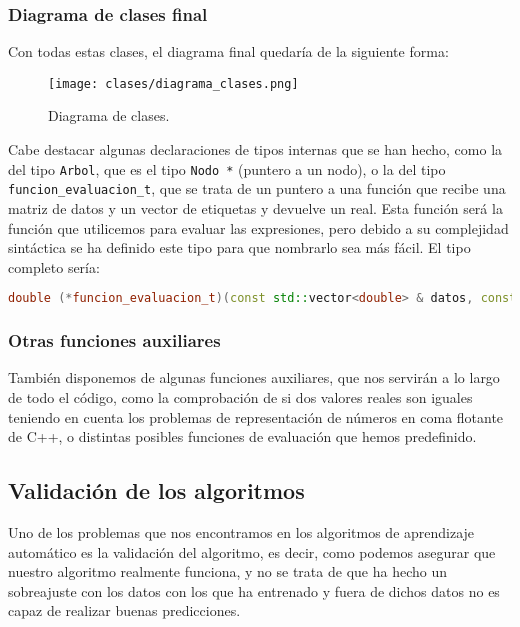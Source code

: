 \subsubsection{Diagrama de clases final}

Con todas estas clases, el diagrama final quedaría de la siguiente forma:

\begin{figure}[H]
	 \centering
	 \texttt{[image: clases/diagrama\_clases.png]}
	 \caption{Diagrama de clases.}
	\label{fig:diagrama_clases}
\end{figure}

Cabe destacar algunas declaraciones de tipos internas que se han hecho, como la del tipo \texttt{Arbol}, que es el tipo \texttt{Nodo *} (puntero a un nodo), o la del tipo \texttt{funcion\_evaluacion\_t}, que se trata de un puntero a una función que recibe una matriz de datos y un vector de etiquetas y devuelve un real. Esta función será la función que utilicemos para evaluar las expresiones, pero debido a su complejidad sintáctica se ha definido este tipo para que nombrarlo sea más fácil. El tipo completo sería:

\begin{lstlisting}[language=C++]
double (*funcion_evaluacion_t)(const std::vector<double> & datos, const std::vector<double> & etiquetas)
\end{lstlisting}

\subsubsection{Otras funciones auxiliares}

También disponemos de algunas funciones auxiliares, que nos servirán a lo largo de todo el código, como la comprobación de si dos valores reales son iguales teniendo en cuenta los problemas de representación de números en coma flotante de C++, o distintas posibles funciones de evaluación que hemos predefinido.

\newpage

\subsection{Validación de los algoritmos}


Uno de los problemas que nos encontramos en los algoritmos de aprendizaje automático es la validación del algoritmo, es decir, como podemos asegurar que nuestro algoritmo realmente funciona, y no se trata de que ha hecho un sobreajuste con los datos con los que ha entrenado y fuera de dichos datos no es capaz de realizar buenas predicciones.

